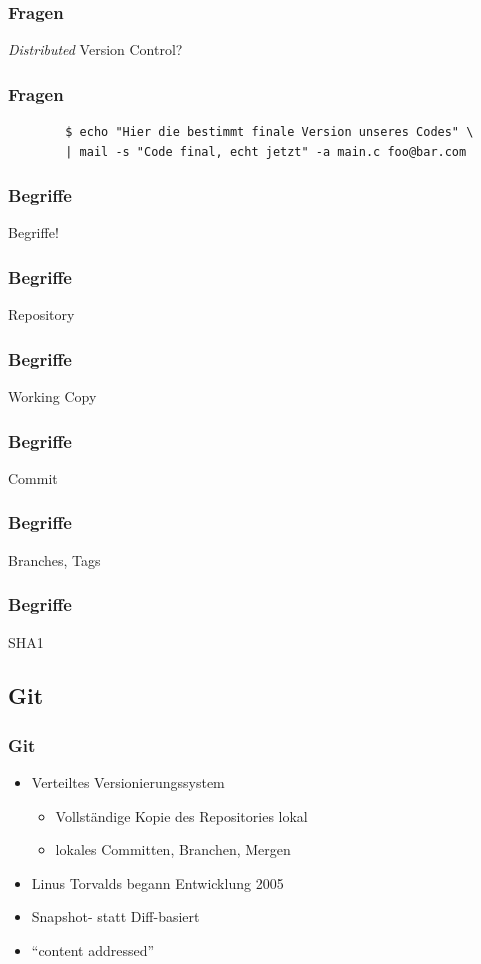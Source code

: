 \documentclass[]{beamer}
\begin{document}
\begin{frame}
	\frametitle{Fragen}
	\Huge{\emph{Distributed} Version Control?}
\end{frame}

\begin{frame}[fragile]
	\frametitle{Fragen}
	\begin{verbatim}
		$ echo "Hier die bestimmt finale Version unseres Codes" \ 
		| mail -s "Code final, echt jetzt" -a main.c foo@bar.com
	\end{verbatim}
\end{frame}

\begin{frame}
	\frametitle{Begriffe}
	\Huge{Begriffe!}\\
	\only<2>{\fontsize{20}{10}\selectfont yay!}
\end{frame}

\begin{frame}
	\frametitle{Begriffe}
	\Huge{Repository}
\end{frame}

\begin{frame}
	\frametitle{Begriffe}
	\Huge{Working Copy}
\end{frame}

\begin{frame}
	\frametitle{Begriffe}
	\Huge{Commit}
\end{frame}

\begin{frame}
	\frametitle{Begriffe}
	\Huge{Branches, Tags}
\end{frame}

\begin{frame}
	\frametitle{Begriffe}
	\Huge{SHA1}
\end{frame}

\subsection{Git}
\begin{frame}
	\frametitle{Git}
	\begin{itemize}
		\item
			Verteiltes Versionierungssystem
			\begin{itemize}
				\item
					Vollständige Kopie des Repositories lokal
				\item
					lokales Committen, Branchen, Mergen
			\end{itemize}
		\item
			Linus Torvalds begann Entwicklung 2005
		\item
			Snapshot- statt Diff-basiert
		\item
			``content addressed''
	\end{itemize}
\end{frame}
\end{document}
